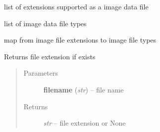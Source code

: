 \documentclass[letterpaper,10pt,english]{sphinxmanual}
\begin{document}

\begin{fulllineitems}
\label{api/ClearMap.IO:ClearMap.IO.IO.dataFileExtensions}
list of extensions supported as a image data file

\end{fulllineitems}


\begin{fulllineitems}
\label{api/ClearMap.IO:ClearMap.IO.IO.dataFileTypes}
list of image data file types

\end{fulllineitems}


\begin{fulllineitems}
\label{api/ClearMap.IO:ClearMap.IO.IO.dataFileExtensionToType}
map from image file extensions to image file types

\end{fulllineitems}


\begin{fulllineitems}
\label{api/ClearMap.IO:ClearMap.IO.IO.fileExtension}
Returns file extension if exists
\begin{quote}\begin{description}
\item[{Parameters}] \leavevmode
\textbf{filename} (\emph{str}) --
file name

\item[{Returns}] \leavevmode
\emph{str} --
file extension or None

\end{description}\end{quote}

\end{fulllineitems}

\end{document}
